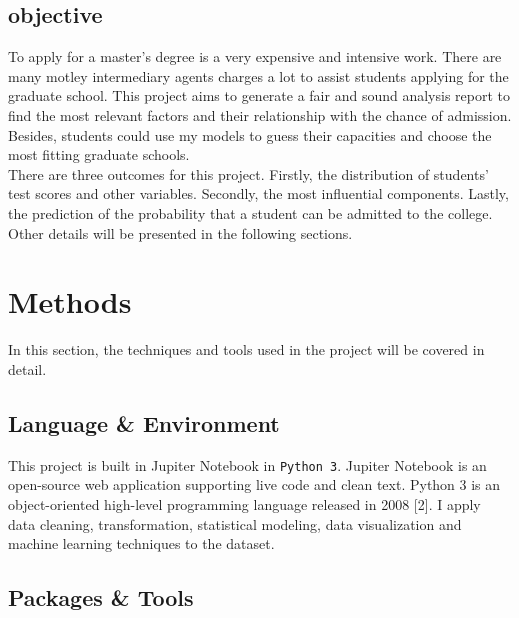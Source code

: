\documentclass[12pt]{article}
\begin{document}
\begin{sloppypar}
\subsection{objective}

To apply for a master's degree is a very expensive and intensive work. There are many motley intermediary agents charges a lot to assist students applying for the graduate school. This project aims to generate a fair and sound analysis report to find the most relevant factors and their relationship with the chance of admission. Besides, students could use my models to guess their capacities and choose the most fitting graduate schools.\\
There are three outcomes for this project. Firstly, the distribution of students' test scores and other variables. Secondly, the most influential components. Lastly, the prediction of the probability that a student can be admitted to the college. Other details will be presented in the following sections. 

\section{Methods}

In this section, the techniques and tools used in the project will be covered in detail. 

\subsection{Language \& Environment}

This project is built in Jupiter Notebook in \texttt{Python 3}. Jupiter Notebook is an open-source web application supporting live code and clean text. Python 3 is an object-oriented high-level programming language released in 2008 [2]. I apply data cleaning, transformation, statistical modeling, data visualization and machine learning techniques to the dataset.
\subsection{Packages \& Tools}


\end{sloppypar}
\end{document}
